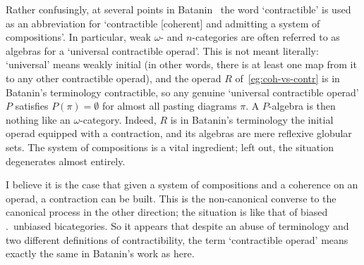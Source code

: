 Rather confusingly, at several points in Batanin~\cite{BatMGC} the word
`contractible' is used as an abbreviation for `contractible [coherent] and
admitting a system of compositions'.  In particular, weak $\omega$- and
$n$-categories are often referred to as algebras for a `universal
contractible operad'.  This is not meant literally: `universal' means
weakly%
%
%
initial (in other words, there is at least one map from it to any
other contractible operad), and the operad $R$ of~\ref{eg:coh-vs-contr} is
in Batanin's terminology contractible, so any genuine `universal
contractible operad' $P$ satisfies $P(\pi) = \emptyset$ for almost all
pasting diagrams $\pi$.  A $P$-algebra is then nothing like an
$\omega$-category.  Indeed, $R$ is in Batanin's terminology the initial
operad equipped with a contraction, and its algebras are mere reflexive
globular sets.  The system of compositions is a vital ingredient; left out,
the situation degenerates almost entirely.

I believe it is the case that given a system of compositions and a
coherence on an operad, a contraction can be built.  This is the
non-canonical converse to the canonical process in the other direction; the
situation is like that of biased \vs.\ unbiased bicategories.  So it
appears that despite an abuse of terminology and two different definitions
of contractibility, the term `contractible operad' means exactly the same
in Batanin's work as here.%
%
%

